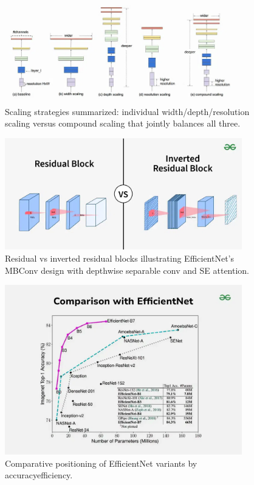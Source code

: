 \begin{figure}[H]
  \centering
  \includegraphics[width=0.92\textwidth]{../new_work/websites/Efficientnet Architecture - GeeksforGeeks_files/1_-ENqv4TI0JuyY6Nq8XQlAA.png}
  \caption{Scaling strategies summarized: individual width/depth/resolution scaling versus compound scaling that jointly balances all three.}
  \label{fig:effnet_gfg_scaling}
\end{figure}

\begin{figure}[H]
  \centering
  \includegraphics[width=0.92\textwidth]{../new_work/websites/Efficientnet Architecture - GeeksforGeeks_files/Residual-Block-vs-Inverted-Residual-Block.png}
  \caption{Residual vs inverted residual blocks illustrating EfficientNet’s MBConv design with depthwise separable conv and SE attention.}
  \label{fig:effnet_gfg_mbconv}
\end{figure}

\begin{figure}[H]
  \centering
  \includegraphics[width=0.92\textwidth]{../new_work/websites/Efficientnet Architecture - GeeksforGeeks_files/Comparison-with-EfficientNet-(1).png}
  \caption{Comparative positioning of EfficientNet variants by accuracy\textendash efficiency.}
  \label{fig:effnet_gfg_compare}
\end{figure}

